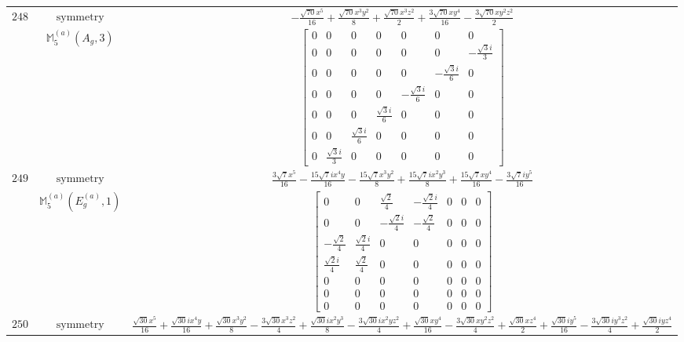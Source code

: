 \documentclass[fleqn,8pt,landscape]{jsarticle}
\begin{document}
\begin{longtable}{ccc}
$ 248 $ & $ \text{symmetry} $ & $ - \frac{\sqrt{70} x^{5}}{16} + \frac{\sqrt{70} x^{3} y^{2}}{8} + \frac{\sqrt{70} x^{3} z^{2}}{2} + \frac{3 \sqrt{70} x y^{4}}{16} - \frac{3 \sqrt{70} x y^{2} z^{2}}{2} $ \\
$  $ & $ \mathbb{M}_{5}^{(a)}(A_{g},3) $ & $ \begin{bmatrix} 0 & 0 & 0 & 0 & 0 & 0 & 0 \\ 0 & 0 & 0 & 0 & 0 & 0 & - \frac{\sqrt{3} i}{3} \\ 0 & 0 & 0 & 0 & 0 & - \frac{\sqrt{3} i}{6} & 0 \\ 0 & 0 & 0 & 0 & - \frac{\sqrt{3} i}{6} & 0 & 0 \\ 0 & 0 & 0 & \frac{\sqrt{3} i}{6} & 0 & 0 & 0 \\ 0 & 0 & \frac{\sqrt{3} i}{6} & 0 & 0 & 0 & 0 \\ 0 & \frac{\sqrt{3} i}{3} & 0 & 0 & 0 & 0 & 0 \end{bmatrix} $ \\ \hline
$ 249 $ & $ \text{symmetry} $ & $ \frac{3 \sqrt{7} x^{5}}{16} - \frac{15 \sqrt{7} i x^{4} y}{16} - \frac{15 \sqrt{7} x^{3} y^{2}}{8} + \frac{15 \sqrt{7} i x^{2} y^{3}}{8} + \frac{15 \sqrt{7} x y^{4}}{16} - \frac{3 \sqrt{7} i y^{5}}{16} $ \\
$  $ & $ \mathbb{M}_{5}^{(a)}(E_{g}^{(a)},1) $ & $ \begin{bmatrix} 0 & 0 & \frac{\sqrt{2}}{4} & - \frac{\sqrt{2} i}{4} & 0 & 0 & 0 \\ 0 & 0 & - \frac{\sqrt{2} i}{4} & - \frac{\sqrt{2}}{4} & 0 & 0 & 0 \\ - \frac{\sqrt{2}}{4} & \frac{\sqrt{2} i}{4} & 0 & 0 & 0 & 0 & 0 \\ \frac{\sqrt{2} i}{4} & \frac{\sqrt{2}}{4} & 0 & 0 & 0 & 0 & 0 \\ 0 & 0 & 0 & 0 & 0 & 0 & 0 \\ 0 & 0 & 0 & 0 & 0 & 0 & 0 \\ 0 & 0 & 0 & 0 & 0 & 0 & 0 \end{bmatrix} $ \\ \hline
$ 250 $ & $ \text{symmetry} $ & $ \frac{\sqrt{30} x^{5}}{16} + \frac{\sqrt{30} i x^{4} y}{16} + \frac{\sqrt{30} x^{3} y^{2}}{8} - \frac{3 \sqrt{30} x^{3} z^{2}}{4} + \frac{\sqrt{30} i x^{2} y^{3}}{8} - \frac{3 \sqrt{30} i x^{2} y z^{2}}{4} + \frac{\sqrt{30} x y^{4}}{16} - \frac{3 \sqrt{30} x y^{2} z^{2}}{4} + \frac{\sqrt{30} x z^{4}}{2} + \frac{\sqrt{30} i y^{5}}{16} - \frac{3 \sqrt{30} i y^{3} z^{2}}{4} + \frac{\sqrt{30} i y z^{4}}{2} $ \\

\end{longtable}
\end{document}
